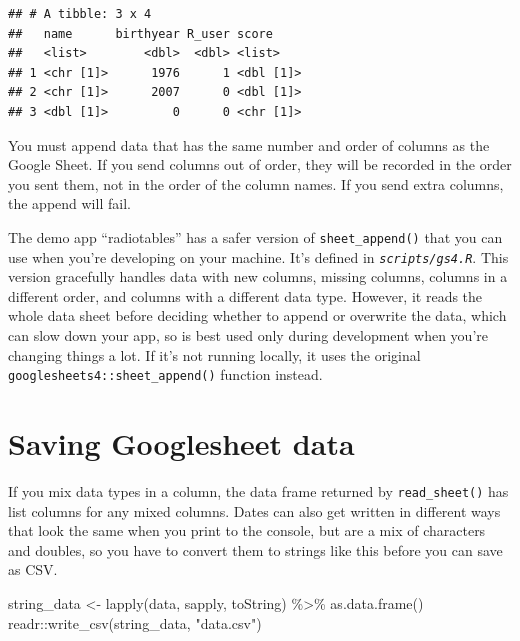 \documentclass[
  oneside]{book}
\newenvironment{Shaded}{\begin{snugshade}}{\end{snugshade}}
\newcommand{\FunctionTok}[1]{\textcolor[rgb]{0.00,0.00,0.00}{#1}}
\newcommand{\NormalTok}[1]{#1}
\newcommand{\OtherTok}[1]{\textcolor[rgb]{0.56,0.35,0.01}{#1}}
\newcommand{\SpecialCharTok}[1]{\textcolor[rgb]{0.00,0.00,0.00}{#1}}
\newcommand{\StringTok}[1]{\textcolor[rgb]{0.31,0.60,0.02}{#1}}
\begin{document}
\begin{verbatim}
## # A tibble: 3 x 4
##   name      birthyear R_user score    
##   <list>        <dbl>  <dbl> <list>   
## 1 <chr [1]>      1976      1 <dbl [1]>
## 2 <chr [1]>      2007      0 <dbl [1]>
## 3 <dbl [1]>         0      0 <chr [1]>
\end{verbatim}

\begin{dangerous}
You must append data that has the same number and order of columns as the Google Sheet. If you send columns out of order, they will be recorded in the order you sent them, not in the order of the column names. If you send extra columns, the append will fail.

\end{dangerous}

The demo app ``radiotables'' has a safer version of \texttt{sheet\_append}\texttt{()} that you can use when you're developing on your machine. It's defined in \textit{\texttt{scripts/gs4.R}}. This version gracefully handles data with new columns, missing columns, columns in a different order, and columns with a different data type. However, it reads the whole data sheet before deciding whether to append or overwrite the data, which can slow down your app, so is best used only during development when you're changing things a lot. If it's not running locally, it uses the original \texttt{googlesheets4::sheet\_append}\texttt{()} function instead.

\hypertarget{gs4_save}{%
\section{Saving Googlesheet data}\label{gs4_save}}

If you mix data types in a column, the data frame returned by \texttt{read\_sheet}\texttt{()} has list columns for any mixed columns. Dates can also get written in different ways that look the same when you print to the console, but are a mix of characters and doubles, so you have to convert them to strings like this before you can save as CSV.

\begin{Shaded}
\begin{Highlighting}[]
\NormalTok{string\_data }\OtherTok{\textless{}{-}} \FunctionTok{lapply}\NormalTok{(data, sapply, toString) }\SpecialCharTok{\%\textgreater{}\%}
    \FunctionTok{as.data.frame}\NormalTok{()}
\NormalTok{readr}\SpecialCharTok{::}\FunctionTok{write\_csv}\NormalTok{(string\_data, }\StringTok{"data.csv"}\NormalTok{)}
\end{Highlighting}
\end{Shaded}
\end{document}
